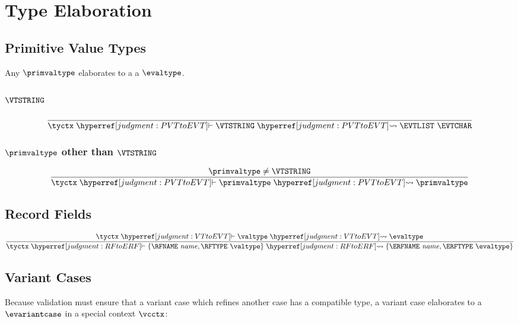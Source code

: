 \section{Type Elaboration}


\subsection{Primitive Value Types}
\label{judgment:PVTtoEVT}


Any $\primvaltype$ elaborates to a a $\evaltype$.

\subsubsection{$\VTSTRING$}

\[
  \frac{
  }{
    \tyctx \vdashh!PVTtoEVT! \VTSTRING \leadstoh!PVTtoEVT! \EVTLIST~\EVTCHAR
  }
\]

\subsubsection{$\primvaltype$ other than $\VTSTRING$}

\[
  \frac{
    \primvaltype \neq \VTSTRING
  }{
    \tyctx \vdashh!PVTtoEVT! \primvaltype \leadstoh!PVTtoEVT! \primvaltype
  }
\]

\subsection{Record Fields}
\label{judgment:RFtoERF}


\[
  \frac{
    \tyctx \vdashh!VTtoEVT! \valtype \leadstoh!VTtoEVT! \evaltype
  }{
    \tyctx \vdashh!RFtoERF! \{ \RFNAME~\name, \RFTYPE~\valtype \}
    \leadstoh!RFtoERF! \{ \ERFNAME~\name, \ERFTYPE~\evaltype \}
  }
\]

\subsection{Variant Cases}
\label{judgment:VCtoEVC}

Because validation must ensure that a variant case which refines
another case has a compatible type, a variant case elaborates to a
$\evariantcase$ in a special context $\vcctx$:

